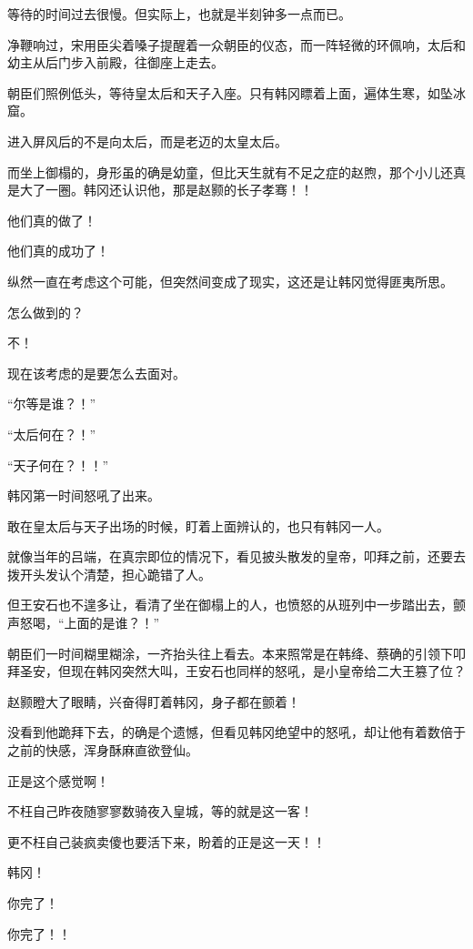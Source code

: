 等待的时间过去很慢。但实际上，也就是半刻钟多一点而已。

净鞭响过，宋用臣尖着嗓子提醒着一众朝臣的仪态，而一阵轻微的环佩响，太后和幼主从后门步入前殿，往御座上走去。

朝臣们照例低头，等待皇太后和天子入座。只有韩冈瞟着上面，遍体生寒，如坠冰窟。

进入屏风后的不是向太后，而是老迈的太皇太后。

而坐上御榻的，身形虽的确是幼童，但比天生就有不足之症的赵煦，那个小儿还真是大了一圈。韩冈还认识他，那是赵颢的长子孝骞！！

他们真的做了！

他们真的成功了！

纵然一直在考虑这个可能，但突然间变成了现实，这还是让韩冈觉得匪夷所思。

怎么做到的？

不！

现在该考虑的是要怎么去面对。

“尔等是谁？！”

“太后何在？！”

“天子何在？！！”

韩冈第一时间怒吼了出来。

敢在皇太后与天子出场的时候，盯着上面辨认的，也只有韩冈一人。

就像当年的吕端，在真宗即位的情况下，看见披头散发的皇帝，叩拜之前，还要去拨开头发认个清楚，担心跪错了人。

但王安石也不遑多让，看清了坐在御榻上的人，也愤怒的从班列中一步踏出去，颤声怒喝，“上面的是谁？！”

朝臣们一时间糊里糊涂，一齐抬头往上看去。本来照常是在韩绛、蔡确的引领下叩拜圣安，但现在韩冈突然大叫，王安石也同样的怒吼，是小皇帝给二大王篡了位？

赵颢瞪大了眼睛，兴奋得盯着韩冈，身子都在颤着！

没看到他跪拜下去，的确是个遗憾，但看见韩冈绝望中的怒吼，却让他有着数倍于之前的快感，浑身酥麻直欲登仙。

正是这个感觉啊！

不枉自己昨夜随寥寥数骑夜入皇城，等的就是这一客！

更不枉自己装疯卖傻也要活下来，盼着的正是这一天！！

韩冈！

你完了！

你完了！！

